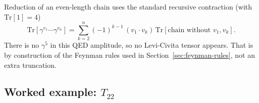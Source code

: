 \documentclass[11pt]{article}
\begin{document}
Reduction of an even-length chain uses the standard recursive contraction
(with $\mathrm{Tr}[1]=4$)
\begin{equation}
  \mathrm{Tr}[\gamma^{v_1}\cdots\gamma^{v_n}]
  = \sum_{k=2}^{n}(-1)^{k-1}\,(v_1{\cdot}v_k)\,
    \mathrm{Tr}[\text{chain without $v_1,v_k$}].
  \label{eq:contraction}
\end{equation}
There is no $\gamma^5$ in this QED amplitude, so no Levi-Civita tensor
appears. That is by construction of the Feynman rules used in
Section~\ref{sec:feynman-rules}, not an extra truncation.

\subsection{Worked example: $T_{22}$}
\label{sec:T22}
\end{document}

